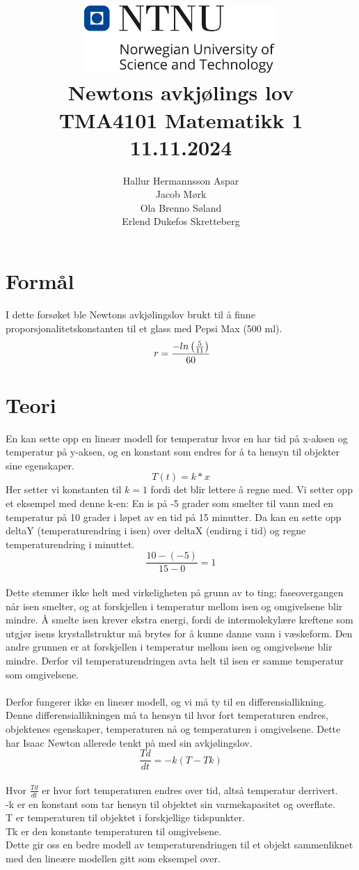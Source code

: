 \documentclass[a4paper,12pt]{article}
\title{
    \vspace{2cm} %
    \includegraphics[width=0.55\textwidth]{ntnu_hoeyde_eng.png} \\ %
    \vspace{1cm} %
    \textbf{\Huge Newtons avkjølings lov} \\
    \vspace{1cm} %
    \large TMA4101 Matematikk 1 \\
    \vspace{0.5cm} %
    \large 11.11.2024
}
\author{Hallur Hermannsson Aspar \\ Jacob Mørk \\ Ola Brenno Søland \\ Erlend Dukefos Skretteberg}
\date{}
\begin{document}
\maketitle
\thispagestyle{empty}
\newpage

\setcounter{page}{1}  %
\tableofcontents
\newpage

\section{Formål}
I dette forsøket ble Newtons avkjølingslov brukt til å finne
proporsjonalitetskonstanten til et glass med Pepsi Max (500 ml). \\
\[\ r = \frac{\--ln\left(\frac{5}{11}\right)}{60} \]


\section{Teori}
En kan sette opp en lineær modell for temperatur hvor en har tid på x-aksen og temperatur på y-aksen, og en konstant som endres for å ta hensyn til objekter sine egenskaper. 
\[T(t)=k*x\] 
Her setter vi konstanten til \(k=1\) fordi det blir lettere å regne med. Vi setter opp et eksempel med denne k-en: 
En is på -5 grader som smelter til vann med en temperatur på 10 grader i løpet av en tid på 15 minutter. Da kan en sette opp deltaY (temperaturendring i isen) over deltaX (endirng i tid) og regne temperaturendring i minuttet. 
\[\frac{10-(-5)}{15-0}=1\]\quad \\ 
Dette stemmer ikke helt med virkeligheten på grunn av to ting;  faseovergangen når isen smelter, og at forskjellen i temperatur mellom isen og omgivelsene blir mindre. Å smelte isen krever ekstra energi, fordi de intermolekylære kreftene som utgjør isens krystallstruktur må brytes for å kunne danne vann i væskeform. Den andre grunnen er at forskjellen i temperatur mellom isen og omgivelsene blir mindre. Derfor vil temperaturendringen avta helt til isen er samme temperatur som omgivelsene. \\
\\
Derfor fungerer ikke en lineær modell, og vi må ty til en differensiallikning. Denne differensiallikningen må ta hensyn til hvor fort temperaturen endres, objektenes egenskaper, temperaturen nå og temperaturen i omgivelsene. Dette har Isaac Newton allerede tenkt på med sin avkjølingslov.
\[\frac{Td}{dt}=-k(T-Tk)\]\quad \\
Hvor \(\frac{Td}{dt}\) er hvor fort temperaturen endres over tid, altså temperatur derrivert.\\
-k er en konstant som tar hensyn til objektet sin varmekapasitet og overflate.\\
T er temperaturen til objektet i forskjellige tidspunkter.\\ Tk er den konstante temperaturen til omgivelsene.\\
Dette gir oss en bedre modell av temperaturendringen til et objekt sammenliknet med den lineære modellen gitt som eksempel over.
\end{document}
